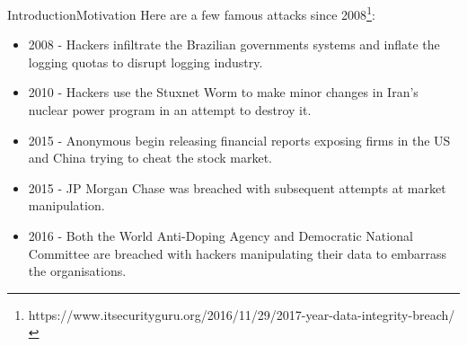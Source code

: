 \begin{frame}{Introduction}{Motivation}
    Here are a few famous attacks since 2008\footnote{https://www.itsecurityguru.org/2016/11/29/2017-year-data-integrity-breach/}:
    \begin{itemize}
        \item 2008 - Hackers infiltrate the Brazilian governments systems and inflate the logging quotas to disrupt logging industry.
        \item 2010 - Hackers use the Stuxnet Worm to make minor changes in Iran’s nuclear power program in an attempt to destroy it.
        \item 2015 - Anonymous begin releasing financial reports exposing firms in the US and China trying to cheat the stock market.
        \item 2015 - JP Morgan Chase was breached with subsequent attempts at market manipulation.
        \item 2016 - Both the World Anti-Doping Agency and Democratic National Committee are breached with hackers manipulating their data to embarrass the organisations.
    \end{itemize}
\end{frame}


